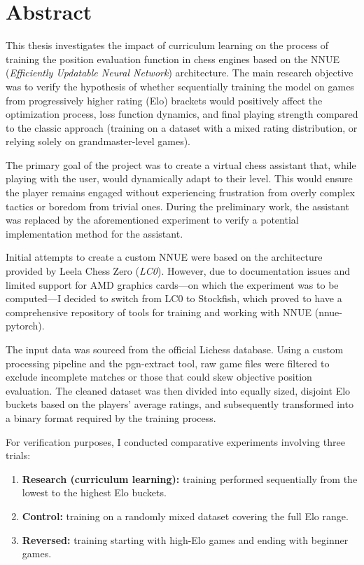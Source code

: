 \documentclass[12pt,a4paper]{report}
\begin{document}
\section*{Abstract}

This thesis investigates the impact of curriculum learning on the process of training the position evaluation function in chess engines based on the NNUE (\textit{Efficiently Updatable Neural Network}) architecture. The main research objective was to verify the hypothesis of whether sequentially training the model on games from progressively higher rating (Elo) brackets would positively affect the optimization process, loss function dynamics, and final playing strength compared to the classic approach (training on a dataset with a mixed rating distribution, or relying solely on grandmaster-level games).

The primary goal of the project was to create a virtual chess assistant that, while playing with the user, would dynamically adapt to their level. This would ensure the player remains engaged without experiencing frustration from overly complex tactics or boredom from trivial ones. During the preliminary work, the assistant was replaced by the aforementioned experiment to verify a potential implementation method for the assistant.

Initial attempts to create a custom NNUE were based on the architecture provided by Leela Chess Zero (\textit{LC0}). However, due to documentation issues and limited support for AMD graphics cards—on which the experiment was to be computed—I decided to switch from LC0 to Stockfish, which proved to have a comprehensive repository of tools for training and working with NNUE (nnue-pytorch).

The input data was sourced from the official Lichess database. Using a custom processing pipeline and the pgn-extract tool, raw game files were filtered to exclude incomplete matches or those that could skew objective position evaluation. The cleaned dataset was then divided into equally sized, disjoint Elo buckets based on the players' average ratings, and subsequently transformed into a binary format required by the training process.

For verification purposes, I conducted comparative experiments involving three trials:
\begin{enumerate}
    \item \textbf{Research (curriculum learning):} training performed sequentially from the lowest to the highest Elo buckets.
    \item \textbf{Control:} training on a randomly mixed dataset covering the full Elo range.
    \item \textbf{Reversed:} training starting with high-Elo games and ending with beginner games.
\end{enumerate}
\end{document}
